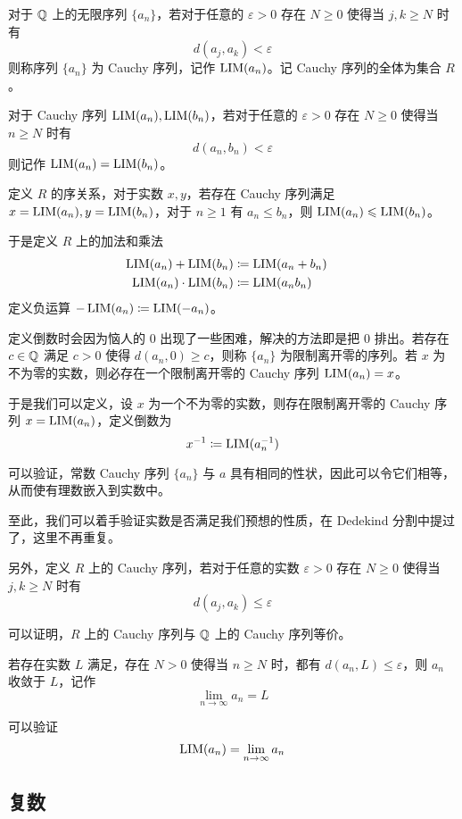 对于 $\mathbb{Q}$ 上的无限序列 $\{a_n\}$，若对于任意的 $\varepsilon > 0$ 存在 $N \geqslant 0$ 使得当 $j,k \geqslant N$ 时有 
$$d(a_j,a_k) < \varepsilon$$
则称序列 $\{a_n\}$ 为 Cauchy 序列，记作 $\operatorname{{LIM}}(a_n)$。记 Cauchy 序列的全体为集合 $R$。

对于 Cauchy 序列 $\operatorname{{LIM}}(a_n),\operatorname{{LIM}}(b_n)$，若对于任意的 $\varepsilon > 0$ 存在 $N \geqslant 0$ 使得当 $n \geqslant N$ 时有
$$d(a_n,b_n) < \varepsilon$$
则记作 $\operatorname{{LIM}}(a_n) = \operatorname{{LIM}}(b_n)$。

定义 $R$ 的序关系，对于实数 $x,y$，若存在 Cauchy 序列满足 $x=\operatorname{{LIM}}(a_n),y=\operatorname{{LIM}}(b_n)$，对于 $n\geqslant 1$ 有 $a_n \leqslant b_n$，则 $\operatorname{{LIM}}(a_n) \leqslant \operatorname{{LIM}}(b_n)$。

于是定义 $R$ 上的加法和乘法
\begin{equation*}
	\begin{aligned}
		\operatorname{{LIM}}(a_n) + \operatorname{{LIM}}(b_n) &\coloneqq  \operatorname{{LIM}}(a_n+b_n)&\\
		\operatorname{{LIM}}(a_n) \cdot \operatorname{{LIM}}(b_n) &\coloneqq  \operatorname{{LIM}}(a_nb_n)\\
	\end{aligned}
\end{equation*}
定义负运算 $-\operatorname{{LIM}}(a_n) \coloneqq  \operatorname{{LIM}}(-a_n)$。

定义倒数时会因为恼人的 $0$ 出现了一些困难，解决的方法即是把 $0$ 排出。若存在 $c\in \mathbb{Q}$ 满足 $c > 0$ 使得 $d(a_n,0) \geqslant c$，则称 $\{a_n\}$ 为限制离开零的序列。若 $x$ 为不为零的实数，则必存在一个限制离开零的 Cauchy 序列 $\operatorname{{LIM}}(a_n) = x$。

于是我们可以定义，设 $x$ 为一个不为零的实数，则存在限制离开零的 Cauchy 序列 $x=\operatorname{{LIM}}(a_n)$，定义倒数为
$$x^{-1} \coloneqq  \operatorname{{LIM}}(a_n^{-1})$$

可以验证，常数 Cauchy 序列 $\{a_n\}$ 与 $a$ 具有相同的性状，因此可以令它们相等，从而使有理数嵌入到实数中。

至此，我们可以着手验证实数是否满足我们预想的性质，在 Dedekind 分割中提过了，这里不再重复。

另外，定义 $R$ 上的 Cauchy 序列，若对于任意的实数 $\varepsilon > 0$ 存在 $N \geqslant 0$ 使得当 $j,k \geqslant N$ 时有 
$$d(a_j,a_k) \leqslant \varepsilon$$

可以证明，$R$ 上的 Cauchy 序列与 $\mathbb{Q}$ 上的 Cauchy 序列等价。

若存在实数 $L$ 满足，存在 $N>0$ 使得当 $n \geqslant N$ 时，都有 $d(a_n,L) \leqslant \varepsilon$，则 $a_n$ 收敛于 $L$，记作
$$\lim_{n\to \infty} a_n = L$$

可以验证
$$\operatorname{{LIM}}(a_n) = \lim_{n\to \infty} a_n$$

\subsection{复数}

